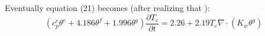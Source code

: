 Eventually equation (21) becomes (after realizing that ):
\begin{equation}
(c_p^e \theta^e + 4.186 \theta^f + 1.996 \theta^g) \frac{\partial T_c}{\partial t} = 2.26 + 2.19 T_c \nabla \cdot ( K_w  \theta^g)
\end{equation}